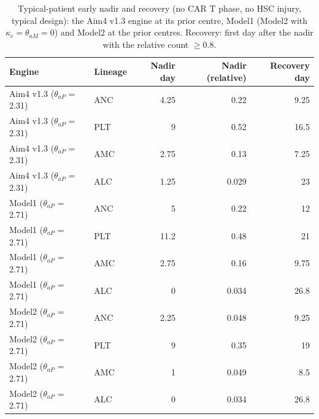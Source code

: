 \begin{table}[!htbp]
\centering
\small
\setlength{\tabcolsep}{3.5pt}
\caption{Typical-patient early nadir and recovery (no CAR T phase, no HSC injury, typical design): the Aim4 v1.3 engine at its prior centre, Model1 (Model2 with $\kappa_c=\theta_{aM}=0$) and Model2 at the prior centres. Recovery: first day after the nadir with the relative count $\geq 0.8$.}
\label{tab:aim4}
\begin{tabular}{llrrr}
\toprule
Engine & Lineage & Nadir day & Nadir (relative) & Recovery day \\
\midrule
Aim4 v1.3 ($\theta_{aP}$ = 2.31) & ANC & 4.25 & 0.22 & 9.25 \\
Aim4 v1.3 ($\theta_{aP}$ = 2.31) & PLT & 9 & 0.52 & 16.5 \\
Aim4 v1.3 ($\theta_{aP}$ = 2.31) & AMC & 2.75 & 0.13 & 7.25 \\
Aim4 v1.3 ($\theta_{aP}$ = 2.31) & ALC & 1.25 & 0.029 & 23 \\
Model1 ($\theta_{aP}$ = 2.71) & ANC & 5 & 0.22 & 12 \\
Model1 ($\theta_{aP}$ = 2.71) & PLT & 11.2 & 0.48 & 21 \\
Model1 ($\theta_{aP}$ = 2.71) & AMC & 2.75 & 0.16 & 9.75 \\
Model1 ($\theta_{aP}$ = 2.71) & ALC & 0 & 0.034 & 26.8 \\
Model2 ($\theta_{aP}$ = 2.71) & ANC & 2.25 & 0.048 & 9.25 \\
Model2 ($\theta_{aP}$ = 2.71) & PLT & 9 & 0.35 & 19 \\
Model2 ($\theta_{aP}$ = 2.71) & AMC & 1 & 0.049 & 8.5 \\
Model2 ($\theta_{aP}$ = 2.71) & ALC & 0 & 0.034 & 26.8 \\
\bottomrule
\end{tabular}
\end{table}
